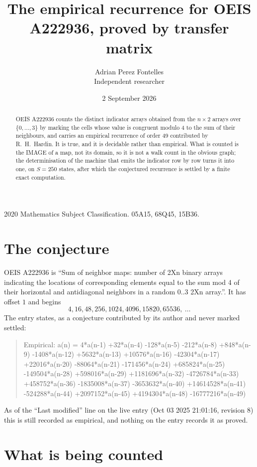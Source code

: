 \documentclass[11pt,a4paper]{article}
\title{The empirical recurrence for OEIS A222936, proved by transfer matrix}
\author{Adrian Perez Fontelles\\ \small Independent researcher}
\date{2 September 2026}
\theoremstyle{plain}
\theoremstyle{definition}
\begin{document}
\maketitle

\begin{abstract}
OEIS A222936 counts the distinct indicator arrays obtained from the $n\times2$ arrays over
$\{0,\dots,3\}$ by marking the cells whose value is congruent modulo 4 to the sum of their neighbours, and carries an
empirical recurrence of order $49$ contributed by R.~H.~Hardin. It is true, and it is
decidable rather than empirical. What is counted is the IMAGE of a map, not its domain, so it
is not a walk count in the obvious graph; the determinisation of the machine that emits the
indicator row by row turns it into one, on $S=250$ states, after which the conjectured
recurrence is settled by a finite exact computation.
\end{abstract}

\noindent\small 2020 Mathematics Subject Classification. 05A15, 68Q45, 15B36.\normalsize

\section{The conjecture}

OEIS A222936 is ``Sum of neighbor maps: number of 2Xn binary arrays indicating the locations of corresponding elements equal to the sum mod 4 of their horizontal and antidiagonal neighbors in a random 0..3 2Xn array.''. It has offset $1$ and begins
\[
4, 16, 48, 256, 1024, 4096, 15820, 65536,\ \dots
\]
The entry states, as a conjecture contributed by its author and never marked settled:
\begin{quote}
Empirical: a(n) = 4*a(n-1) +32*a(n-4) -128*a(n-5) -212*a(n-8) +848*a(n-9) -1408*a(n-12) +5632*a(n-13) +10576*a(n-16) -42304*a(n-17) +22016*a(n-20) -88064*a(n-21) -171456*a(n-24) +685824*a(n-25) -149504*a(n-28) +598016*a(n-29) +1181696*a(n-32) -4726784*a(n-33) +458752*a(n-36) -1835008*a(n-37) -3653632*a(n-40) +14614528*a(n-41) -524288*a(n-44) +2097152*a(n-45) +4194304*a(n-48) -16777216*a(n-49)
\end{quote}
As of the ``Last modified'' line on the live entry (Oct 03 2025 21:01:16, revision 8) this is still
recorded as empirical, and nothing on the entry records it as proved.

\section{What is being counted}
\end{document}
